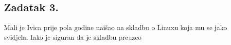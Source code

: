 \documentclass{exam}
\begin{document}
                                                                                            \subsection*{Zadatak
                                                                                            3.}
                                                                                            Mali
                                                                                            je
                                                                                            Ivica
                                                                                            prije
                                                                                            pola
                                                                                            godine
                                                                                            naišao
                                                                                            na
                                                                                            skladbu
                                                                                            o
                                                                                            Linuxu
                                                                                            koja
                                                                                            mu
                                                                                            se
                                                                                            jako
                                                                                            svidjela.
                                                                                            Iako
                                                                                            je
                                                                                            siguran
                                                                                            da
                                                                                            je
                                                                                            skladbu
                                                                                            preuzeo
\end{document}
